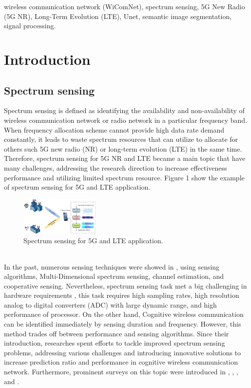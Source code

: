 \documentclass[journal]{IEEEtran} %
\begin{document}
\begin{IEEEkeywords}
    wireless communication network (WiComNet), spectrum sensing, 5G New Radio (5G NR), Long-Term Evolution (LTE), Unet, semantic image segmentation, signal processing.
\end{IEEEkeywords}

\section{Introduction}

\subsection{Spectrum sensing}
Spectrum sensing is defined as identifying the availability and non-availability of wireless communication network or radio network in a particular frequency band. When frequency allocation scheme cannot provide high data rate demand constantly, it leads to waste spectrum resources that can utilize to allocate for others such 5G new radio (NR) or long-term evolution (LTE) in the same time. Therefore, spectrum sensing for 5G NR and LTE became a main topic that have many challenges, addressing the research direction to increase effectiveness performance and utilizing limited spectrum resource. Figure 1 show the example of spectrum sensing for 5G and LTE application.

\begin{figure}[h]
    \centering
    \includegraphics[width=0.35\textwidth]{img/Design-Overview.jpg}
    \caption{Spectrum sensing for 5G and LTE application.}
    \label{fig1}
\end{figure}

\\
\indent 
In the past, numerous sensing techniques were showed in \cite{YucekSpectrumSensing}, using sensing algorithms, Multi-Dimensional spectrum sensing, channel estimation, and cooperative sensing. Nevertheless, spectrum sensing task met a big challenging in hardware requirements \cite{YucekSpectrumSensing}, this task requires high sampling rates, high resolution analog to digital converters (ADC) with large dynamic range, and high performance of processor. On the other hand, Cognitive wireless communication can be identified immediately by sensing duration and frequency. However, this method trades off between performance and sensing algorithms. Since their introduction, researches spent efforts to tackle improved spectrum sensing problems, addressing various challenges and introducing innovative solutions to increase prediction ratio and performance in cognitive wireless communication network. Furthermore, prominent surveys on this topic were introduced in \cite{kumar2024analysis}, \cite{YucekSpectrumSensing}, \cite{ali2016advances}, and \cite{liyanaarachchi2021optimized}.
\end{document}
